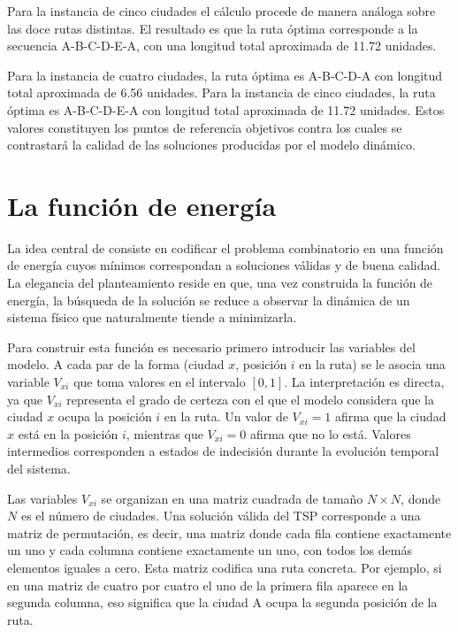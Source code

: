 \documentclass[12pt,a4paper]{article}
\begin{document}
Para la instancia de cinco ciudades el cálculo procede de manera análoga sobre las doce rutas distintas. El resultado es que la ruta óptima corresponde a la secuencia A-B-C-D-E-A, con una longitud total aproximada de 11.72 unidades.

\begin{objetivo}
Para la instancia de cuatro ciudades, la ruta óptima es A-B-C-D-A con longitud total aproximada de 6.56 unidades. Para la instancia de cinco ciudades, la ruta óptima es A-B-C-D-E-A con longitud total aproximada de 11.72 unidades. Estos valores constituyen los puntos de referencia objetivos contra los cuales se contrastará la calidad de las soluciones producidas por el modelo dinámico.
\end{objetivo}

\section{La función de energía}

La idea central de \textcite{HopfieldTank1985} consiste en codificar el problema combinatorio en una función de energía cuyos mínimos correspondan a soluciones válidas y de buena calidad. La elegancia del planteamiento reside en que, una vez construida la función de energía, la búsqueda de la solución se reduce a observar la dinámica de un sistema físico que naturalmente tiende a minimizarla.

Para construir esta función es necesario primero introducir las variables del modelo. A cada par de la forma (ciudad $x$, posición $i$ en la ruta) se le asocia una variable $V_{xi}$ que toma valores en el intervalo $[0, 1]$. La interpretación es directa, ya que $V_{xi}$ representa el grado de certeza con el que el modelo considera que la ciudad $x$ ocupa la posición $i$ en la ruta. Un valor de $V_{xi} = 1$ afirma que la ciudad $x$ está en la posición $i$, mientras que $V_{xi} = 0$ afirma que no lo está. Valores intermedios corresponden a estados de indecisión durante la evolución temporal del sistema.

Las variables $V_{xi}$ se organizan en una matriz cuadrada de tamaño $N \times N$, donde $N$ es el número de ciudades. Una solución válida del TSP corresponde a una matriz de permutación, es decir, una matriz donde cada fila contiene exactamente un uno y cada columna contiene exactamente un uno, con todos los demás elementos iguales a cero. Esta matriz codifica una ruta concreta. Por ejemplo, si en una matriz de cuatro por cuatro el uno de la primera fila aparece en la segunda columna, eso significa que la ciudad A ocupa la segunda posición de la ruta.
\end{document}
